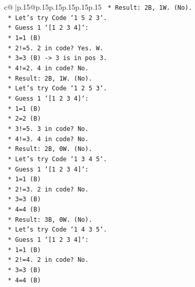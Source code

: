 \documentclass{article}
\begin{document}
{\begin{supertabular}{c@{$\;$}|p{.15\linewidth}@{}p{.15\linewidth}p{.15\linewidth}p{.15\linewidth}p{.15\linewidth}p{.15\linewidth}}
{{{\texttt{                    *   Result: 2B, 1W. (No).} \\
\texttt{            *   Let's try Code `1 5 2 3`.} \\
\texttt{                *   Guess 1 `{[}1 2 3 4{]}`:} \\
\texttt{                    *   1=1 (B)} \\
\texttt{                    *   2!=5. 2 in code? Yes. W.} \\
\texttt{                    *   3=3 (B) {-}> 3 is in pos 3.} \\
\texttt{                    *   4!=2. 4 in code? No.} \\
\texttt{                    *   Result: 2B, 1W. (No).} \\
\texttt{            *   Let's try Code `1 2 5 3`.} \\
\texttt{                *   Guess 1 `{[}1 2 3 4{]}`:} \\
\texttt{                    *   1=1 (B)} \\
\texttt{                    *   2=2 (B)} \\
\texttt{                    *   3!=5. 3 in code? No.} \\
\texttt{                    *   4!=3. 4 in code? No.} \\
\texttt{                    *   Result: 2B, 0W. (No).} \\
\texttt{            *   Let's try Code `1 3 4 5`.} \\
\texttt{                *   Guess 1 `{[}1 2 3 4{]}`:} \\
\texttt{                    *   1=1 (B)} \\
\texttt{                    *   2!=3. 2 in code? No.} \\
\texttt{                    *   3=3 (B)} \\
\texttt{                    *   4=4 (B)} \\
\texttt{                    *   Result: 3B, 0W. (No).} \\
\texttt{            *   Let's try Code `1 4 3 5`.} \\
\texttt{                *   Guess 1 `{[}1 2 3 4{]}`:} \\
\texttt{                    *   1=1 (B)} \\
\texttt{                    *   2!=4. 2 in code? No.} \\
\texttt{                    *   3=3 (B)} \\
\texttt{                    *   4=4 (B)} \\
}}}
\end{supertabular}}
\end{document}
